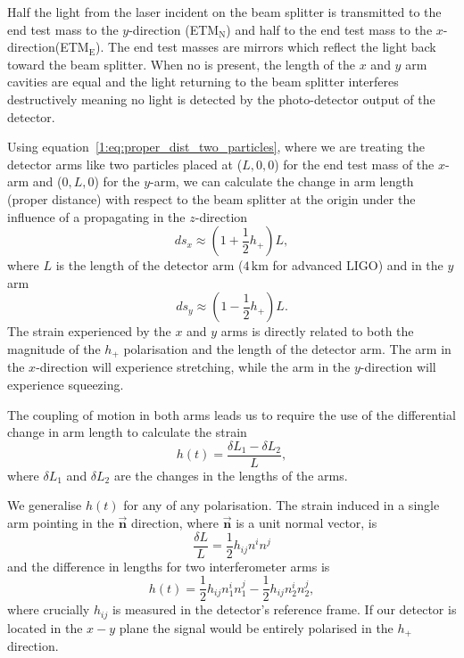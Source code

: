 Half the light from the laser incident on the beam splitter is transmitted to the end test mass to the $y$-direction (ETM$_{\text{N}}$) and half to the end test mass to the $x$-direction(ETM$_{\text{E}}$). The end test masses are mirrors which reflect the light back toward the beam splitter. When no \gw is present, the length of the $x$ and $y$ arm cavities are equal and the light returning to the beam splitter interferes destructively meaning no light is detected by the photo-detector output of the detector.

% 
Using equation~\ref{1:eq:proper_dist_two_particles}, where we are treating the detector arms like two particles placed at ($L, 0, 0$) for the end test mass of the $x$-arm and ($0, L, 0$) for the $y$-arm, we can calculate the change in arm length (proper distance) with respect to the beam splitter at the origin under the influence of a \gw propagating in the $z$-direction
%
\begin{equation}
    ds_{x} \approx \left(1 + \frac{1}{2}h_+\right)L,
\end{equation}
%
where $L$ is the length of the detector arm ($4 \, \text{km}$ for advanced LIGO) and in the $y$ arm
%
\begin{equation}
    ds_{y} \approx \left(1 - \frac{1}{2}h_+\right)L.
\end{equation}
%
The strain experienced by the $x$ and $y$ arms is directly related to both the magnitude of the $h_{+}$ \gwadj polarisation and the length of the detector arm. The arm in the $x$-direction will experience stretching, while the arm in the $y$-direction will experience squeezing.

The coupling of motion in both arms leads us to require the use of the differential change in arm length to calculate the \gwadj strain
%
\begin{equation}
    h(t) = \frac{\delta L_1 - \delta L_2}{L},
    \label{1:eq:frac_length_diff_h_t}
\end{equation}
%
where $\delta L_{1}$ and $\delta L_{2}$ are the changes in the lengths of the arms.

We generalise $h(t)$ for any \gw of any polarisation. The strain induced in a single arm pointing in the $\mathbf{\vec{n}}$ direction, where $\mathbf{\vec{n}}$ is a unit normal vector, is
%
\begin{equation}
    \frac{\delta L}{L} = \frac{1}{2} h_{ij}n^{i}n^{j}
\end{equation}
%
and the difference in lengths for two interferometer arms is
%
\begin{equation}
    h(t) = \frac{1}{2} h_{ij}n_{1}^{i}n_{1}^{j} - \frac{1}{2} h_{ij}n_{2}^{i}n_{2}^{j},
\end{equation}
%
where crucially $h_{ij}$ is measured in the detector's reference frame. If our detector is located in the $x-y$ plane the \gwadj signal would be entirely polarised in the $h_{+}$ direction.


